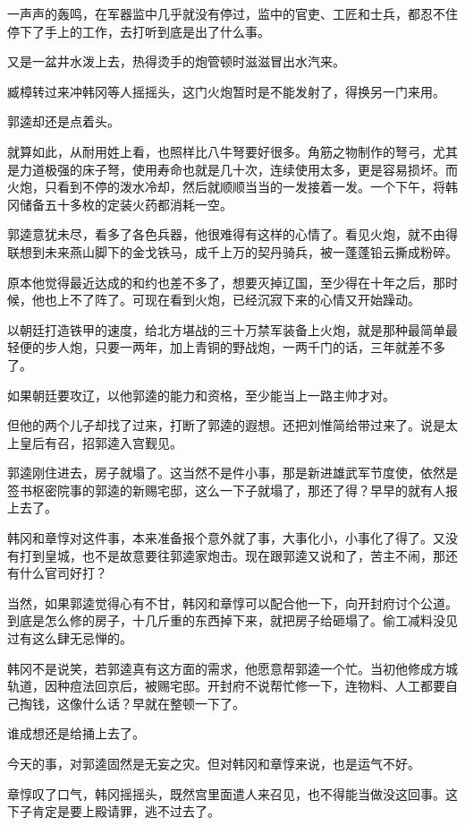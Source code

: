 一声声的轰鸣，在军器监中几乎就没有停过，监中的官吏、工匠和士兵，都忍不住停下了手上的工作，去打听到底是出了什么事。

又是一盆井水泼上去，热得烫手的炮管顿时滋滋冒出水汽来。

臧樟转过来冲韩冈等人摇摇头，这门火炮暂时是不能发射了，得换另一门来用。

郭逵却还是点着头。

就算如此，从耐用姓上看，也照样比八牛弩要好很多。角筋之物制作的弩弓，尤其是力道极强的床子弩，使用寿命也就是几十次，连续使用太多，更是容易损坏。而火炮，只看到不停的泼水冷却，然后就顺顺当当的一发接着一发。一个下午，将韩冈储备五十多枚的定装火药都消耗一空。

郭逵意犹未尽，看多了各色兵器，他很难得有这样的心情了。看见火炮，就不由得联想到未来燕山脚下的金戈铁马，成千上万的契丹骑兵，被一蓬蓬铅云撕成粉碎。

原本他觉得最近达成的和约也差不多了，想要灭掉辽国，至少得在十年之后，那时候，他也上不了阵了。可现在看到火炮，已经沉寂下来的心情又开始躁动。

以朝廷打造铁甲的速度，给北方堪战的三十万禁军装备上火炮，就是那种最简单最轻便的步人炮，只要一两年，加上青铜的野战炮，一两千门的话，三年就差不多了。

如果朝廷要攻辽，以他郭逵的能力和资格，至少能当上一路主帅才对。

但他的两个儿子却找了过来，打断了郭逵的遐想。还把刘惟简给带过来了。说是太上皇后有召，招郭逵入宫觐见。

郭逵刚住进去，房子就塌了。这当然不是件小事，那是新进雄武军节度使，依然是签书枢密院事的郭逵的新赐宅邸，这么一下子就塌了，那还了得？早早的就有人报上去了。

韩冈和章惇对这件事，本来准备报个意外就了事，大事化小，小事化了得了。又没有打到皇城，也不是故意要往郭逵家炮击。现在跟郭逵又说和了，苦主不闹，那还有什么官司好打？

当然，如果郭逵觉得心有不甘，韩冈和章惇可以配合他一下，向开封府讨个公道。到底是怎么修的房子，十几斤重的东西掉下来，就把房子给砸塌了。偷工减料没见过有这么肆无忌惮的。

韩冈不是说笑，若郭逵真有这方面的需求，他愿意帮郭逵一个忙。当初他修成方城轨道，因种痘法回京后，被赐宅邸。开封府不说帮忙修一下，连物料、人工都要自己掏钱，这像什么话？早就在整顿一下了。

谁成想还是给捅上去了。

今天的事，对郭逵固然是无妄之灾。但对韩冈和章惇来说，也是运气不好。

章惇叹了口气，韩冈摇摇头，既然宫里面遣人来召见，也不得能当做没这回事。这下子肯定是要上殿请罪，逃不过去了。

